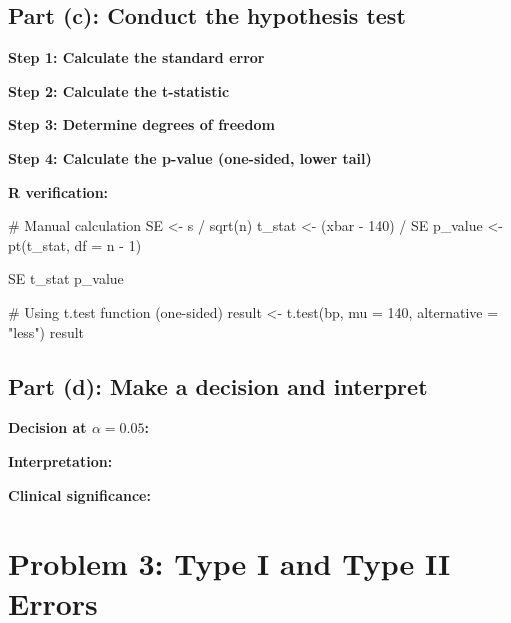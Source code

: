 \documentclass[11pt]{article}
\begin{document}
\vspace{1cm}

\subsection*{Part (c): Conduct the hypothesis test}

\textbf{Step 1: Calculate the standard error}

\vspace{2cm}

\textbf{Step 2: Calculate the t-statistic}

\vspace{2cm}

\textbf{Step 3: Determine degrees of freedom}

\vspace{1cm}

\textbf{Step 4: Calculate the p-value (one-sided, lower tail)}

\vspace{1cm}

\textbf{R verification:}
\begin{rcode}
# Manual calculation
SE <- s / sqrt(n)
t_stat <- (xbar - 140) / SE
p_value <- pt(t_stat, df = n - 1)

SE
t_stat
p_value

# Using t.test function (one-sided)
result <- t.test(bp, mu = 140, alternative = "less")
result
\end{rcode}

\vspace{1cm}

\subsection*{Part (d): Make a decision and interpret}

\textbf{Decision at $\alpha = 0.05$:}

\vspace{1cm}

\textbf{Interpretation:}

\vspace{3cm}

\textbf{Clinical significance:}

\vspace{2cm}

\pagebreak

\section*{Problem 3: Type I and Type II Errors}
\end{document}
